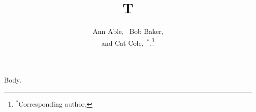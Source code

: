 \documentclass[journal]{IEEEtran}
\begin{document}
\title{T}
\author{Ann Able,~ Bob Baker,\\ and Cat Cole,~$^{*}$.\thanks{$^{*}$Corresponding author.}}
\maketitle
Body.
\end{document}
